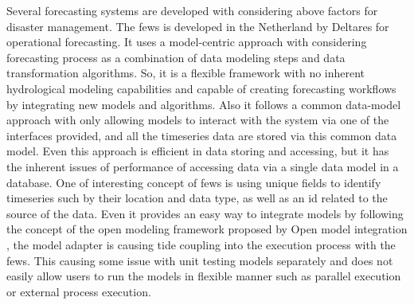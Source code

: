 \documentclass[conference]{IEEEtran}
\newcommand{\db}[1]{\textcolor{blue!40}{#1}}
\begin{document}
\db{Several forecasting systems are} developed with considering above factors for disaster management. The \acrshort{fews}\cite{Werner2013TheSystem} is developed in the Netherland by Deltares for operational forecasting. It uses a model-centric approach with considering forecasting process as a combination of data modeling steps and data transformation algorithms. So, it is a flexible framework with no inherent hydrological modeling capabilities and capable of creating forecasting workflows by integrating new models and algorithms. Also it follows a common data-model approach with only allowing models to interact with the system via one of the interfaces provided, and all the timeseries data are stored via this common data model. Even this approach is efficient in data storing and accessing, but it has the inherent issues of performance of accessing data via a single data model in a database. One of interesting concept of \acrshort{fews} is using unique fields to identify timeseries such by their location and data type, as well as an id related to the source of the data. Even it provides an easy way to integrate models by following the concept of the open modeling framework proposed by Open model integration \cite{Kokkonen2003InterfacingXML}, the model adapter is causing tide coupling into the execution process with the \acrshort{fews}. This causing some issue with unit testing models separately and does not easily allow users to run the models in flexible manner such as parallel execution or external process execution.
\end{document}
